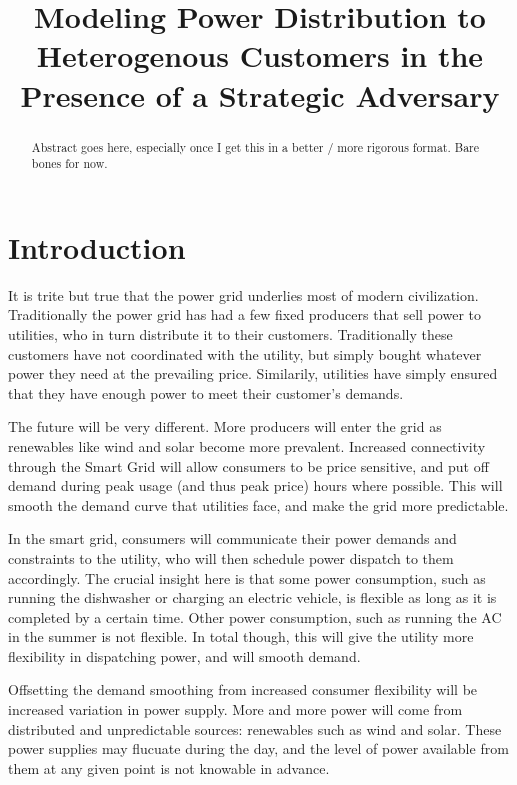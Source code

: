 \documentclass[conference]{IEEEtran}
\begin{document}
\title{Modeling Power Distribution to Heterogenous Customers in the Presence of a Strategic Adversary}

\author{
}

\maketitle

\begin{abstract}
Abstract goes here, especially once I get this in a better / more rigorous format.  Bare bones for now.
\end{abstract}

\section{Introduction}

It is trite but true that the power grid underlies most of modern civilization.  Traditionally the power grid has had a 
few fixed producers that sell power to utilities, who in turn distribute it to their customers.  Traditionally these 
customers have not coordinated with the utility, but simply bought whatever power they need at the prevailing price.  
Similarily, utilities have simply ensured that they have enough power to meet their customer's demands.  

The future will be very different.  More producers will enter the grid as renewables like wind and solar become more
prevalent.  Increased connectivity through the Smart Grid will allow consumers to be price sensitive, and put off 
demand during peak usage (and thus peak price) hours where possible.  This will smooth the demand curve that utilities face,
and make the grid more predictable.

In the smart grid, consumers will communicate their power demands and constraints to the utility, who will then schedule
power dispatch to them accordingly.  The crucial insight here is that some power consumption, such as running the dishwasher
or charging an electric vehicle, is flexible as long as it is completed by a certain time.  Other power consumption, such as
running the AC in the summer is not flexible.  In total though, this will give the utility more flexibility in dispatching power,
and will smooth demand.

Offsetting the demand smoothing from increased consumer flexibility will be increased variation in power supply.  More and
more power will come from distributed and unpredictable sources: renewables such as wind and solar.  These power supplies
may flucuate during the day, and the level of power available from them at any given point is not knowable in advance.
\end{document}
